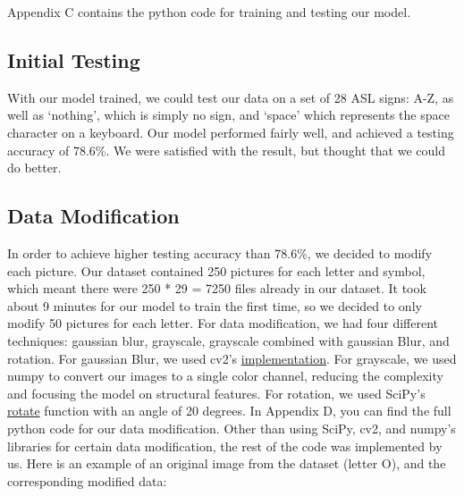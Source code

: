 \documentclass[10pt,twocolumn,letterpaper]{article}
\begin{document}
Appendix C contains the python code for training and testing our model.

\subsection{Initial Testing}
With our model trained, we could test our data on a set of 28 ASL signs: A-Z, 
as well as ‘nothing’, which is simply no sign, and ‘space’ which represents 
the space character on a keyboard. Our model performed fairly well, and achieved
a testing accuracy of 78.6\%. We were satisfied with the result, but thought that we could do better.

\subsection{Data Modification}
In order to achieve higher testing accuracy than 78.6\%, we decided to modify 
each picture. Our dataset contained 250 pictures for each letter and symbol,
which meant there were 250 * 29 = 7250 files already in our dataset. It took
about 9 minutes for our model to train the first time, so we decided to only
modify 50 pictures for each letter. For data modification, we had four different
techniques: gaussian blur, grayscale, grayscale combined with gaussian Blur,
and rotation. For gaussian Blur, we used cv2’s
\href{https://docs.opencv.org/4.x/d4/d86/group__imgproc__filter.html#gaabe8c836e97159a9193fb0b11ac52cf1}{implementation}.
For grayscale, we used numpy to convert our images to a single color channel,
reducing the complexity and focusing the model on structural features. 
For rotation, we used SciPy’s
\href{https://docs.scipy.org/doc/scipy/reference/generated/scipy.ndimage.rotate.html}{rotate}
function with an angle of 20 degrees. In Appendix D, you can find the
full python code for our data modification. 
Other than using SciPy, cv2, and numpy’s libraries for certain data 
modification, the rest of the code was implemented by us. Here is an example
of an original image from the dataset (letter O), and the corresponding modified data:
\end{document}
